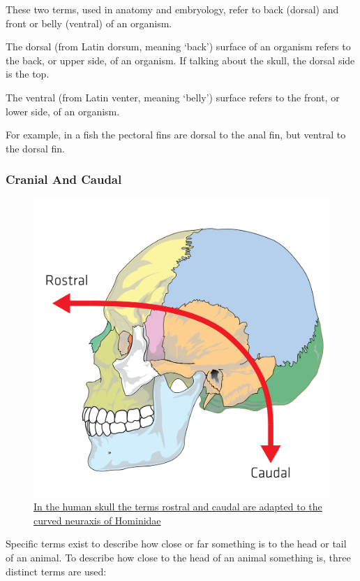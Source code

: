 These two terms, used in anatomy and embryology, refer to back (dorsal) and front or belly (ventral) of an organism.

The dorsal (from Latin dorsum, meaning `back') surface of an organism refers to the back, or upper side, of an organism. If talking about the skull, the dorsal side is the top.

The ventral (from Latin venter, meaning `belly') surface refers to the front, or lower side, of an organism.

For example, in a fish the pectoral fins are dorsal to the anal fin, but ventral to the dorsal fin.

\hypertarget{cranial-and-caudal}{%
\subsubsection{Cranial And Caudal}\label{cranial-and-caudal}}



\begin{figure}

{\centering \includegraphics[width=0.7\linewidth]{./figures/appendix/Rostralcaudal} 

}

\caption{\href{https://commons.wikimedia.org/wiki/File:Rostralcaudal.svg}{In the human skull the terms rostral and caudal are adapted to the curved neuraxis of Hominidae}}\label{fig:rostralcaudal}
\end{figure}

Specific terms exist to describe how close or far something is to the head or tail of an animal. To describe how close to the head of an animal something is, three distinct terms are used:

